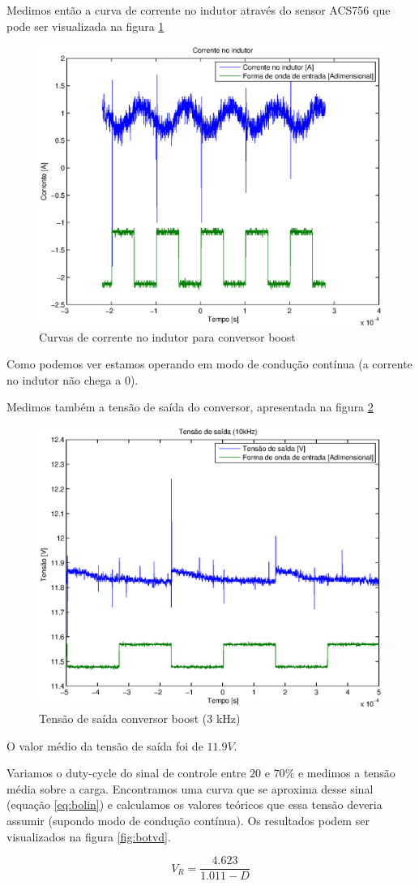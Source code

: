 \documentclass{article}
\begin{document}
Medimos então a curva de corrente no indutor através do sensor ACS756 que pode ser visualizada na figura \ref{fig:boil}
\begin{figure}[H]
	\centering
	\includegraphics[width=0.5\linewidth]{Dados/boost/il}
	\caption{Curvas de corrente no indutor para conversor boost}
	\label{fig:boil}
\end{figure}
Como podemos ver estamos operando em modo de condução contínua (a corrente no indutor não chega a 0).

Medimos também a tensão de saída do conversor, apresentada na figura \ref{fig:bot3k}
\begin{figure}[H]
	\centering
	\includegraphics[width=0.5\linewidth]{Dados/boost/t3k}
	\caption{Tensão de saída conversor boost (3 kHz)}
	\label{fig:bot3k}
\end{figure}

O valor médio da tensão de saída foi de $11.9 V$.

Variamos o duty-cycle do sinal de controle entre $20$ e $70\%$ e medimos a tensão média sobre a carga. Encontramos uma curva que se aproxima desse sinal (equação \ref{eq:bolin}) e calculamos os valores teóricos que essa tensão deveria assumir (supondo modo de condução contínua). Os resultados podem ser visualizados na figura \ref{fig:botvd}.

\begin{capequ}
	\begin{equation}
	V_R = \frac{4.623}{1.011 - D}	
	\end{equation}
	\caption{Curva que aproxima a tensão medida de saída em função do duty-cycle}
	\label{eq:bolin}
\end{capequ}
\end{document}
